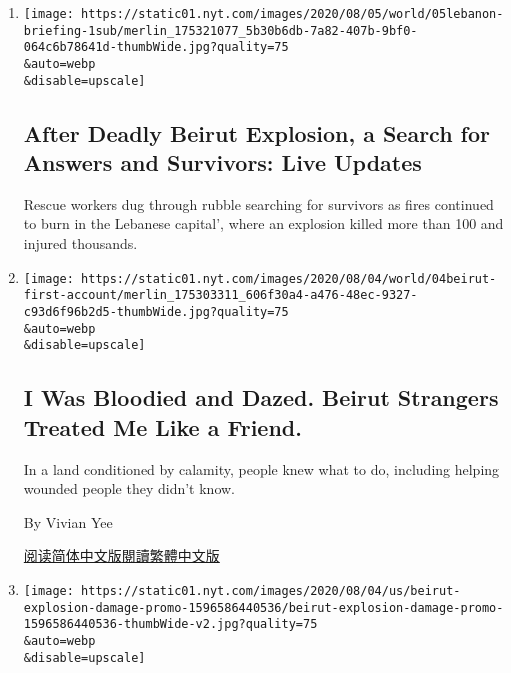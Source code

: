 \begin{enumerate}
\def\labelenumi{\arabic{enumi}.}
\item
  \href{/2020/08/05/world/middleeast/beirut-explosion.html}{}

  \texttt{[image: https://static01.nyt.com/images/2020/08/05/world/05lebanon-briefing-1sub/merlin\_175321077\_5b30b6db-7a82-407b-9bf0-064c6b78641d-thumbWide.jpg?quality=75\\\&auto=webp\\\&disable=upscale]}

  \hypertarget{after-deadly-beirut-explosion-a-search-for-answers-and-survivors-live-updates}{%
  \subsection{After Deadly Beirut Explosion, a Search for Answers and
  Survivors: Live
  Updates}\label{after-deadly-beirut-explosion-a-search-for-answers-and-survivors-live-updates}}

  Rescue workers dug through rubble searching for survivors as fires
  continued to burn in the Lebanese capital', where an explosion killed
  more than 100 and injured thousands.
\item
  \href{/2020/08/04/world/middleeast/lebanon-explosion-beirut.html}{}

  \texttt{[image: https://static01.nyt.com/images/2020/08/04/world/04beirut-first-account/merlin\_175303311\_606f30a4-a476-48ec-9327-c93d6f96b2d5-thumbWide.jpg?quality=75\\\&auto=webp\\\&disable=upscale]}

  \hypertarget{i-was-bloodied-and-dazed-beirut-strangers-treated-me-like-a-friend}{%
  \subsection{I Was Bloodied and Dazed. Beirut Strangers Treated Me Like
  a
  Friend.}\label{i-was-bloodied-and-dazed-beirut-strangers-treated-me-like-a-friend}}

  In a land conditioned by calamity, people knew what to do, including
  helping wounded people they didn't know.

  By Vivian Yee

  \href{https://cn.nytimes.com/world/20200805/beirut-explosion-first-person/}{阅读简体中文版}\href{https://cn.nytimes.com/world/20200805/beirut-explosion-first-person/zh-hant/}{閱讀繁體中文版}
\item
  \href{/interactive/2020/08/04/world/middleeast/beirut-explosion-damage.html}{}

  \texttt{[image: https://static01.nyt.com/images/2020/08/04/us/beirut-explosion-damage-promo-1596586440536/beirut-explosion-damage-promo-1596586440536-thumbWide-v2.jpg?quality=75\\\&auto=webp\\\&disable=upscale]}


\end{enumerate}
